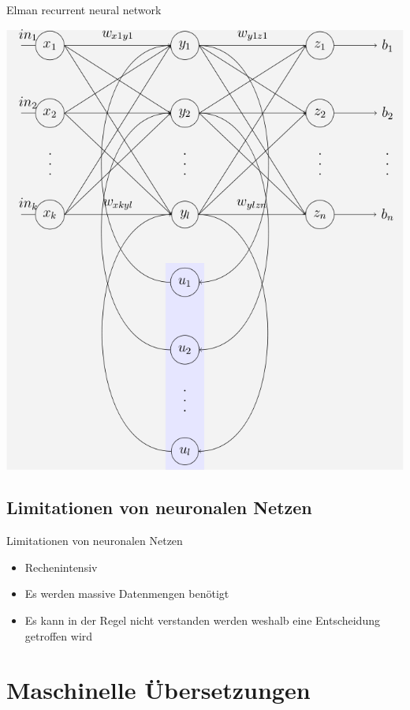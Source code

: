 \documentclass[18pt]{beamer}
\begin{document}
\begin{frame}{Elman recurrent neural network}
\begin{center}
\includegraphics[scale=0.25]{images/Elman_RNN.png}
\cite{Elman}
\end{center}
\end{frame}

\subsection{Limitationen von neuronalen Netzen}

\begin{frame}{Limitationen von neuronalen Netzen}
\begin{itemize}
\item{Rechenintensiv}
\item{Es werden massive Datenmengen benötigt}
\item{Es kann in der Regel nicht verstanden werden weshalb eine Entscheidung getroffen wird}
\end{itemize}
\end{frame}

\section{Maschinelle Übersetzungen}
\end{document}
